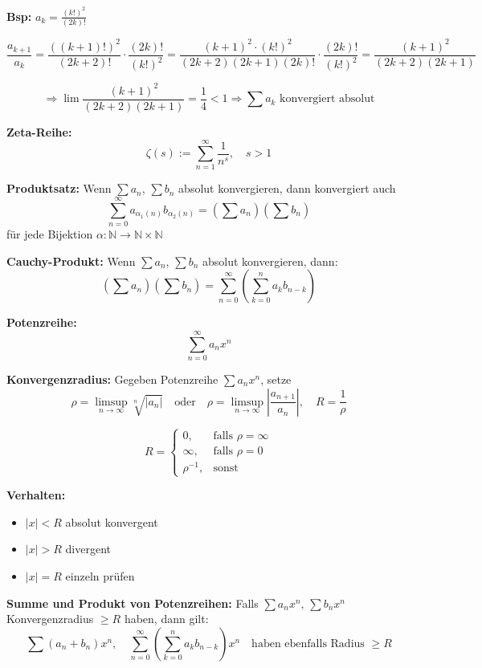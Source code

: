 \textbf{Bsp: } \( a_k = \frac{(k!)^2}{(2k)!} \)

\[
\frac{a_{k+1}}{a_k} = \frac{((k+1)!)^2}{(2k+2)!} \cdot \frac{(2k)!}{(k!)^2}
= \frac{(k+1)^2 \cdot (k!)^2}{(2k+2)(2k+1)(2k)!} \cdot \frac{(2k)!}{(k!)^2}
= \frac{(k+1)^2}{(2k+2)(2k+1)}
\]

\[
\Rightarrow \lim \frac{(k+1)^2}{(2k+2)(2k+1)} = \frac{1}{4} < 1
\Rightarrow \sum a_k \text{ konvergiert absolut}
\]

\textbf{Zeta-Reihe:}  
\[
\zeta(s) := \sum_{n=1}^\infty \frac{1}{n^s}, \quad s > 1
\]

\textbf{Produktsatz:}  
Wenn \( \sum a_n \), \( \sum b_n \) absolut konvergieren, dann konvergiert auch  
\[
\sum_{n=0}^\infty a_{\alpha_1(n)} b_{\alpha_2(n)}
= \left( \sum a_n \right)\left( \sum b_n \right)
\]
für jede Bijektion \( \alpha: \mathbb{N} \to \mathbb{N} \times \mathbb{N} \)

\textbf{Cauchy-Produkt:}  
Wenn \( \sum a_n \), \( \sum b_n \) absolut konvergieren, dann:
\[
\left( \sum a_n \right) \left( \sum b_n \right)
= \sum_{n=0}^\infty \left( \sum_{k=0}^n a_k b_{n-k} \right)
\]

\textbf{Potenzreihe:}  
\[
\sum_{n=0}^\infty a_n x^n
\]

\textbf{Konvergenzradius:}  
Gegeben Potenzreihe \( \sum a_n x^n \), setze
\[
\rho = \limsup_{n \to \infty} \sqrt[n]{|a_n|} \quad \text{oder} \quad
\rho = \limsup_{n \to \infty} \left| \frac{a_{n+1}}{a_n} \right|, \quad
R = \frac{1}{\rho}
\]

\[
R =
\begin{cases}
0, & \text{falls } \rho = \infty \\
\infty, & \text{falls } \rho = 0 \\
\rho^{-1}, & \text{sonst}
\end{cases}
\]

\textbf{Verhalten:}
\begin{itemize}
  \item \( |x| < R \) \quad absolut konvergent
  \item \( |x| > R \) \quad divergent
  \item \( |x| = R \) \quad einzeln prüfen
\end{itemize}

\vspace{0.5em}

\textbf{Summe und Produkt von Potenzreihen:}  
Falls \( \sum a_n x^n \), \( \sum b_n x^n \) Konvergenzradius \( \geq R \) haben, dann gilt:
\[
\sum (a_n + b_n)x^n, \quad
\sum_{n=0}^\infty \left( \sum_{k=0}^n a_k b_{n-k} \right) x^n
\quad \text{haben ebenfalls Radius } \geq R
\]

